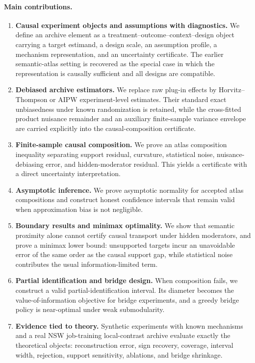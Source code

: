 \documentclass[11pt]{article}
\numberwithin{equation}{section}
\newcommand{\1}{\mathbf 1}
\begin{document}
\paragraph{Main contributions.}
\begin{enumerate}[leftmargin=2.2em]
\item \textbf{Causal experiment objects and assumptions with diagnostics.}  We define an archive element as a treatment--outcome--context--design object carrying a target estimand, a design scale, an assumption profile, a mechanism representation, and an uncertainty certificate.  The earlier semantic-atlas setting is recovered as the special case in which the representation is causally sufficient and all designs are compatible.
\item \textbf{Debiased archive estimators.}  We replace raw plug-in effects by Horvitz–Thompson or AIPW experiment-level estimates. Their standard exact unbiasedness under known randomization is retained, while the cross-fitted product nuisance remainder and an auxiliary finite-sample variance envelope are carried explicitly into the causal-composition certificate.
\item \textbf{Finite-sample causal composition.}  We prove an atlas composition inequality separating support residual, curvature, statistical noise, nuisance-debiasing error, and hidden-moderator residual.  This yields a certificate with a direct uncertainty interpretation.
\item \textbf{Asymptotic inference.}  We prove asymptotic normality for accepted atlas compositions and construct honest confidence intervals that remain valid when approximation bias is not negligible.
\item \textbf{Boundary results and minimax optimality.}  We show that semantic proximity alone cannot certify causal transport under hidden moderators, and prove a minimax lower bound: unsupported targets incur an unavoidable error of the same order as the causal support gap, while statistical noise contributes the usual information-limited term.
\item \textbf{Partial identification and bridge design.}  When composition fails, we construct a valid partial-identification interval.  Its diameter becomes the value-of-information objective for bridge experiments, and a greedy bridge policy is near-optimal under weak submodularity.
\item \textbf{Evidence tied to theory.}  Synthetic experiments with known mechanisms and a real NSW job-training local-contrast archive evaluate exactly the theoretical objects: reconstruction error, sign recovery, coverage, interval width, rejection, support sensitivity, ablations, and bridge shrinkage.
\end{enumerate}
\end{document}
